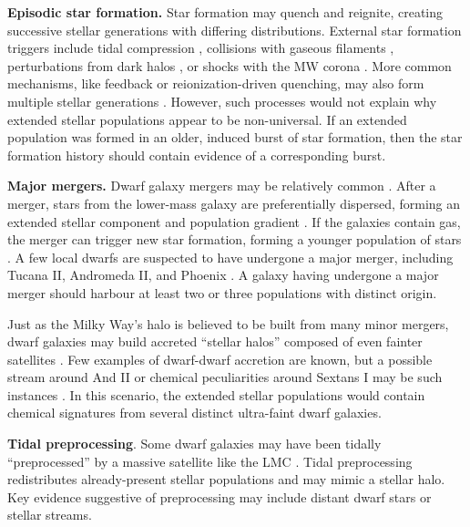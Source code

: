 \textbf{Episodic star formation.} Star formation may quench and
reignite, creating successive stellar generations with differing
distributions. External star formation triggers include tidal
compression \citep{mayer+2001a, dong+lin+murray2003}, collisions with
gaseous filaments \citep{genina+2019}, perturbations from dark halos
\citep{starkenburg+helmi+sales2016}, or shocks with the MW corona
\citep{wright+2019}. More common mechanisms, like feedback or
reionization-driven quenching, may also form multiple stellar
generations
\citep{kawata+2006, benitez-llambay+2015, revaz+jablonka2018}. However,
such processes would not explain why extended stellar populations appear
to be non-universal. If an extended population was formed in an older,
induced burst of star formation, then the star formation history should
contain evidence of a corresponding burst.

\textbf{Major mergers.} Dwarf galaxy mergers may be relatively common
\citep{deason+wetzel+garrison-kimmel2014}. After a merger, stars from
the lower-mass galaxy are preferentially dispersed, forming an extended
stellar component and population gradient
\citep{benitez-llambay+2016, deason+2022}. If the galaxies contain gas,
the merger can trigger new star formation, forming a younger population
of stars \citep[e.g.,][]{genina+2019}. A few local dwarfs are suspected
to have undergone a major merger, including Tucana II, Andromeda II, and
Phoenix
\citep{lokas+2014, fouquet+2017, tarumi+yoshida+frebel2021, cardona-barrero+2021, querci+2025}.
A galaxy having undergone a major merger should harbour at least two or
three populations with distinct origin.

Just as the Milky Way's halo is believed to be built from many minor
mergers, dwarf galaxies may build accreted ``stellar halos'' composed of
even fainter satellites \citep{ricotti+polisensky+cleland2022}. Few
examples of dwarf-dwarf accretion are known, but a possible stream
around And II or chemical peculiarities around Sextans I may be such
instances \citep{amorisco+evans+vandeven2014, roederer+2023}. In this
scenario, the extended stellar populations would contain chemical
signatures from several distinct ultra-faint dwarf galaxies.

\textbf{Tidal preprocessing}. Some dwarf galaxies may have been tidally
``preprocessed'' by a massive satellite like the LMC
\citep[e.g.,][]{santistevan+2023, riley+2024}. Tidal preprocessing
redistributes already-present stellar populations and may mimic a
stellar halo. Key evidence suggestive of preprocessing may include
distant dwarf stars or stellar streams.

